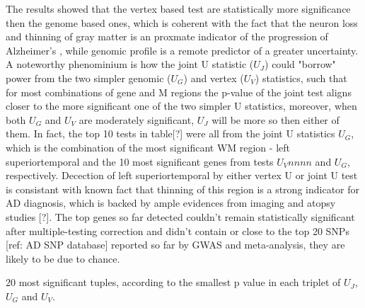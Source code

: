 The results showed that the vertex based test are statistically more significance then the genome based ones, which is coherent with the fact that the neuron loss and thinning of gray matter is an proxmate indicator of the progression of Alzheimer's , while genomic profile is a remote predictor of a greater uncertainty. A noteworthy phenominium is how the joint U statistic ($U_J$) could "borrow" power from the two simpler genomic ($U_G$) and vertex ($U_V$) statistics, such that for most combinations of gene and M regions the p-value of the joint test aligns closer to the more significant one of the two simpler U statistics, moreover, when both $U_G$ and $U_V$ are moderately significant, $U_J$ will be more so then either of them. In fact, the top 10 tests in table[?] were all from the joint U statistics $U_G$, which is the combination of the most significant WM region - left superiortemporal and the 10 most significant genes from tests $U_Vnnnn$ and $U_G$, respectively. Decection of left superiortemporal by either vertex U or joint U test is consistant with known fact that thinning of this region is a strong indicator for AD diagnosis, which is backed by ample evidences from imaging and atopsy studies [?]. The top genes so far detected couldn't remain statistically significant after multiple-testing correction and didn't contain or close to the top 20 SNPs [ref: AD SNP database] reported so far by GWAS and meta-analysis, they are likely to be due to chance.

20 most significant tuples, according to the smallest p value in each triplet of $U_J$, $U_G$ and $U_V$. 



